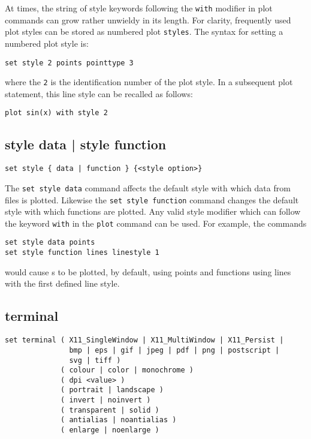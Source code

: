 At times, the string of style keywords following the {\tt with} modifier in
plot commands can grow rather unwieldy in its length. For clarity, frequently
used plot styles can be stored as numbered plot {\tt styles}. The syntax for
setting a numbered plot style is:

\begin{verbatim}
set style 2 points pointtype 3
\end{verbatim}

\noindent where the {\tt 2} is the identification number of the plot style.
In a subsequent plot statement, this line style can be recalled as follows:

\begin{verbatim}
plot sin(x) with style 2
\end{verbatim}


\subsection{style data | style function}

\begin{verbatim}
set style { data | function } {<style option>}
\end{verbatim}

The {\tt set style data} command affects the default style with which data from
files is plotted.  Likewise the {\tt set style function} command changes the
default style with which functions are plotted.  Any valid style modifier which
can follow the keyword {\tt with} in the {\tt plot} command can be used.  For
example, the commands

\begin{verbatim}
set style data points
set style function lines linestyle 1
\end{verbatim}

\noindent would cause \datafile s to be plotted, by default, using points and
functions using lines with the first defined line style.


\subsection{terminal}

\begin{verbatim}
set terminal ( X11_SingleWindow | X11_MultiWindow | X11_Persist |
               bmp | eps | gif | jpeg | pdf | png | postscript |
               svg | tiff )
             ( colour | color | monochrome )
             ( dpi <value> )
             ( portrait | landscape )
             ( invert | noinvert )
             ( transparent | solid )
             ( antialias | noantialias )
             ( enlarge | noenlarge )
\end{verbatim}

